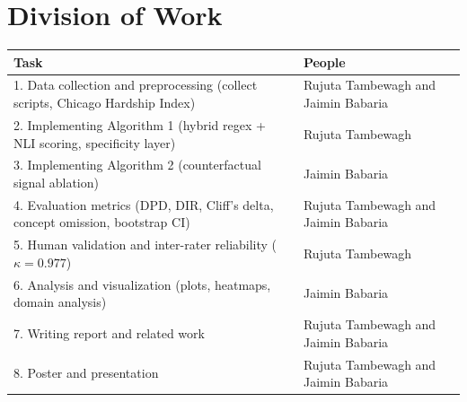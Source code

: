 \documentclass{article}
\begin{document}
\section*{Division of Work}

\begin{table}[h]
\centering
\begin{tabular}{lp{5cm}}
\toprule
\textbf{Task} & \textbf{People}\\
\midrule
1. Data collection and preprocessing (collect scripts, Chicago Hardship Index) & Rujuta Tambewagh and Jaimin Babaria\\
2. Implementing Algorithm 1 (hybrid regex + NLI scoring, specificity layer) & Rujuta Tambewagh\\
3. Implementing Algorithm 2 (counterfactual signal ablation) & Jaimin Babaria\\
4. Evaluation metrics (DPD, DIR, Cliff's delta, concept omission, bootstrap CI) & Rujuta Tambewagh and Jaimin Babaria\\
5. Human validation and inter-rater reliability ($\kappa = 0.977$) & Rujuta Tambewagh\\
6. Analysis and visualization (plots, heatmaps, domain analysis) & Jaimin Babaria\\
7. Writing report and related work & Rujuta Tambewagh and Jaimin Babaria\\
8. Poster and presentation & Rujuta Tambewagh and Jaimin Babaria\\
\bottomrule
\end{tabular}
\end{table}
\end{document}
